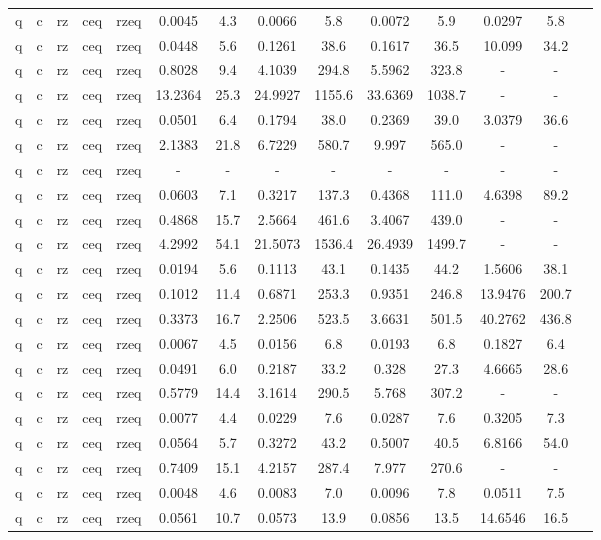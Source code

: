 \begin{table}[htb]
{\begin{tabular}{|c|c|c|c|c|c|c|c|c|c|c|c|c|c|}
q & c & rz & ceq & rzeq & 0.0045 & 4.3 & 0.0066 & 5.8 & 0.0072 & 5.9 & 0.0297 & 5.8 \\ 
q & c & rz & ceq & rzeq & 0.0448 & 5.6 & 0.1261 & 38.6 & 0.1617 & 36.5 & 10.099 & 34.2 \\ 
q & c & rz & ceq & rzeq & 0.8028 & 9.4 & 4.1039 & 294.8 & 5.5962 & 323.8 & - & - \\ 
q & c & rz & ceq & rzeq & 13.2364 & 25.3 & 24.9927 & 1155.6 & 33.6369 & 1038.7 & - & - \\ 
q & c & rz & ceq & rzeq & 0.0501 & 6.4 & 0.1794 & 38.0 & 0.2369 & 39.0 & 3.0379 & 36.6 \\ 
q & c & rz & ceq & rzeq & 2.1383 & 21.8 & 6.7229 & 580.7 & 9.997 & 565.0 & - & - \\ 
q & c & rz & ceq & rzeq & - & - & - & - & - & - & - & - \\ 
q & c & rz & ceq & rzeq & 0.0603 & 7.1 & 0.3217 & 137.3 & 0.4368 & 111.0 & 4.6398 & 89.2 \\ 
q & c & rz & ceq & rzeq & 0.4868 & 15.7 & 2.5664 & 461.6 & 3.4067 & 439.0 & - & - \\ 
q & c & rz & ceq & rzeq & 4.2992 & 54.1 & 21.5073 & 1536.4 & 26.4939 & 1499.7 & - & - \\ 
q & c & rz & ceq & rzeq & 0.0194 & 5.6 & 0.1113 & 43.1 & 0.1435 & 44.2 & 1.5606 & 38.1 \\ 
q & c & rz & ceq & rzeq & 0.1012 & 11.4 & 0.6871 & 253.3 & 0.9351 & 246.8 & 13.9476 & 200.7 \\ 
q & c & rz & ceq & rzeq & 0.3373 & 16.7 & 2.2506 & 523.5 & 3.6631 & 501.5 & 40.2762 & 436.8 \\ 
q & c & rz & ceq & rzeq & 0.0067 & 4.5 & 0.0156 & 6.8 & 0.0193 & 6.8 & 0.1827 & 6.4 \\ 
q & c & rz & ceq & rzeq & 0.0491 & 6.0 & 0.2187 & 33.2 & 0.328 & 27.3 & 4.6665 & 28.6 \\ 
q & c & rz & ceq & rzeq & 0.5779 & 14.4 & 3.1614 & 290.5 & 5.768 & 307.2 & - & - \\ 
q & c & rz & ceq & rzeq & 0.0077 & 4.4 & 0.0229 & 7.6 & 0.0287 & 7.6 & 0.3205 & 7.3 \\ 
q & c & rz & ceq & rzeq & 0.0564 & 5.7 & 0.3272 & 43.2 & 0.5007 & 40.5 & 6.8166 & 54.0 \\ 
q & c & rz & ceq & rzeq & 0.7409 & 15.1 & 4.2157 & 287.4 & 7.977 & 270.6 & - & - \\ 
q & c & rz & ceq & rzeq & 0.0048 & 4.6 & 0.0083 & 7.0 & 0.0096 & 7.8 & 0.0511 & 7.5 \\ 
q & c & rz & ceq & rzeq & 0.0561 & 10.7 & 0.0573 & 13.9 & 0.0856 & 13.5 & 14.6546 & 16.5 \\ 

\end{tabular}}
\end{table}
